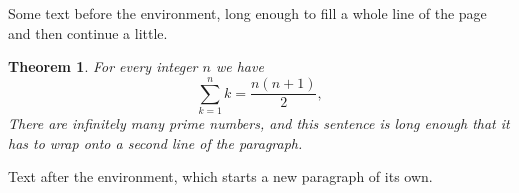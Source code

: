 \documentclass[11pt]{article}
\newtheorem{theorem}{Theorem}
\begin{document}
Some text before the environment, long enough to fill a whole line of the page and then continue a little.
\begin{theorem}
For every integer $n$ we have
\[
  \sum_{k=1}^n k = \frac{n(n+1)}{2},
\]
There are infinitely many prime numbers, and this sentence is long enough that it has to wrap onto a second line of the paragraph.
\end{theorem}
Text after the environment, which starts a new paragraph of its own.
\end{document}

